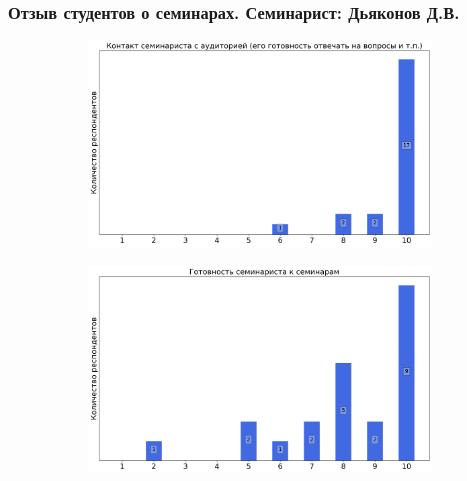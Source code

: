     \subsubsection{Отзыв студентов о семинарах. Семинарист: Дьяконов Д.В.}
        \begin{figure}[H]
            \centering
            \begin{subfigure}[b]{0.45\textwidth}
                \centering
                \includegraphics[width=\textwidth]{images/3 course/Теория поля/seminarists-marks-Дьяконов Д.В.-0.png}
            \end{subfigure}
            \begin{subfigure}[b]{0.45\textwidth}
                \centering
                \includegraphics[width=\textwidth]{images/3 course/Теория поля/seminarists-marks-Дьяконов Д.В.-1.png}
            \end{subfigure}
            \begin{subfigure}[b]{0.45\textwidth}
                \centering

\end{subfigure}
\end{figure}
